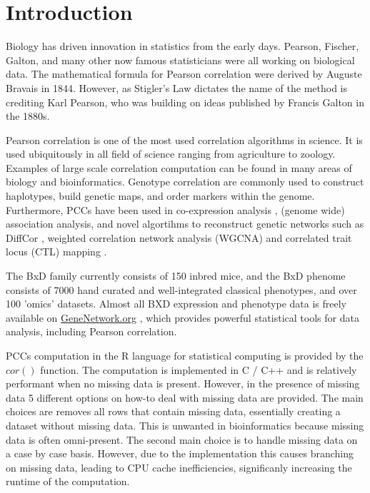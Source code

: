 \documentclass{bioinfo}
\begin{document}
\maketitle

\section{Introduction}
Biology has driven innovation in statistics from the early days. 
Pearson, Fischer, Galton, and many other now famous statisticians 
were all working on biological data. The mathematical formula 
for Pearson correlation were derived by Auguste Bravais in 1844. 
However, as Stigler's Law \citep{Stigler1980} dictates the name 
of the method is crediting Karl Pearson, who was building on 
ideas published by Francis Galton in the 1880s. 


Pearson correlation is one of the most used correlation algorithms in science. 
It is used ubiquitously in all field of science ranging from agriculture to 
zoology. Examples of large scale correlation computation can be found in many 
areas of biology and bioinformatics. Genotype correlation are commonly used to 
construct haplotypes, build genetic maps, and order markers within the genome. 
Furthermore, PCCs have been used in co-expression analysis \citep{Tesson:2010}, 
(genome wide) association analysis, and novel algortihms to reconstruct genetic 
networks such as DiffCor \citep{Fukushima:2013}, weighted correlation network 
analysis (WGCNA) \citep{Horvath:2008} and correlated trait locus (CTL) mapping 
\citep{Arends2016a}.

The BxD family currently consists of 150 inbred mice, and the BxD phenome consists 
of 7000 hand curated and well-integrated classical phenotypes, and over 100 'omics' 
datasets. Almost all BXD expression and phenotype data is freely available on 
\href{https://genenetwork.org/}{GeneNetwork.org} \citep{Sloan2016}, which provides 
powerful statistical tools for data analysis, including Pearson correlation.

PCCs computation in the R language for statistical computing \citep{R:2005} is 
provided by the $cor()$ function. The computation is implemented in C / C++ and 
is relatively performant when no missing data is present. However, 
in the presence of missing data 5 different options on how-to deal 
with missing data are provided. The main choices are removes all rows that 
contain missing data, essentially creating a dataset without missing data. This is 
unwanted in bioinformatics because missing data is often omni-present. 
The second main choice is to handle missing data on a case by case basis. However, 
due to the implementation this causes branching on missing data, leading to CPU 
cache inefficiencies, significanly increasing the runtime of the computation.
\end{document}
